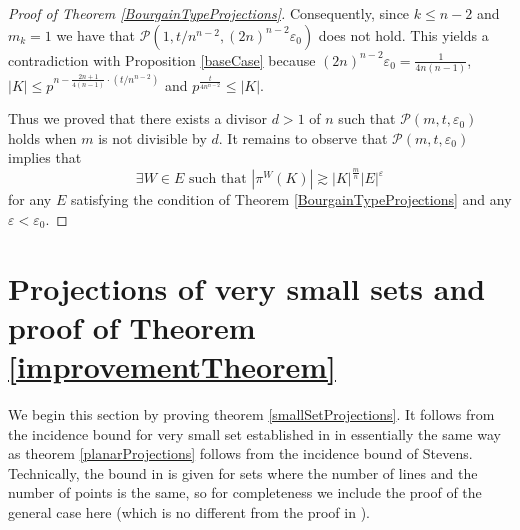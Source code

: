 \documentclass{amsart}
\begin{document}
\begin{proof}[Proof of Theorem \ref{BourgainTypeProjections}]
    Consequently, since $k \leq n - 2$ and $m_k = 1$ we have that $\mathcal{P}(1, t/{n^{n - 2}}, (2n)^{n - 2}\varepsilon_0)$ does not hold. This yields a contradiction with Proposition \ref{baseCase} because $(2n)^{n - 2}\varepsilon_0 = \frac{1}{4n(n - 1)}$, $|K| \leq  p^{n -   \frac{2n + 1}{4(n - 1)} \cdot (t/n^{n - 2})}$ and $p^{\frac{t}{4n^{n - 2}}} \leq |K|$. 

    Thus we proved that there exists a divisor $d > 1$ of $n$ such that $\mathcal{P}(m, t, \varepsilon_0)$ holds when $m$ is not divisible by $d$. It remains to observe that $\mathcal{P}(m, t, \varepsilon_0)$ implies that
     $$\exists W \in E \text{ such that } |\pi^{W}(K)| \gtrsim |K|^{\frac{m}{n}}|E|^{\varepsilon} $$ for any $E$ satisfying the condition of Theorem \ref{BourgainTypeProjections} and any $\varepsilon < \varepsilon_0$.
\end{proof}

\section{Projections of very small sets and proof of Theorem \ref{improvementTheorem}}
We begin this section by proving theorem \ref{smallSetProjections}. It follows from the incidence bound for very small set established in \cite{Gro13} in essentially the same way as theorem \ref{planarProjections} follows from the incidence bound of Stevens. Technically, the bound in \cite{Gro13} is given for sets where the number of lines and the number of points is the same, so for completeness we include the proof of the general case here (which is no different from the proof in \cite{Gro13}).
\end{document}

